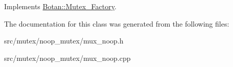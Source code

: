 Implements \hyperlink{classBotan_1_1Mutex__Factory_ade19d854cd215d263ebb3654728322db}{Botan\-::\-Mutex\-\_\-\-Factory}.



The documentation for this class was generated from the following files\-:\begin{DoxyCompactItemize}
\item 
src/mutex/noop\-\_\-mutex/mux\-\_\-noop.\-h\item 
src/mutex/noop\-\_\-mutex/mux\-\_\-noop.\-cpp\end{DoxyCompactItemize}
